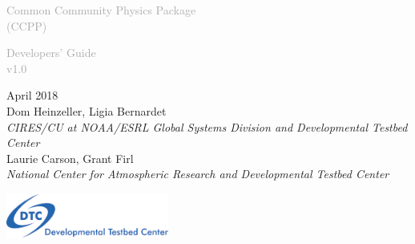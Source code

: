 \begin{titlepage}
\renewcommand{\thefootnote}{\fnsymbol{footnote}}

\vspace*{1em}
\noindent

\begin{center}
\textcolor{darkgray}{\bigsf Common Community Physics Package\\[0.5ex] (CCPP)}
\vspace*{1em}

\textcolor{darkgray}{\bigst Developers' Guide\\[0.5ex] v1.0}
\vspace*{1em}

\large{April 2018}\\[4em]

Dom Heinzeller, Ligia Bernardet\\
\textit{\small{CIRES/CU at NOAA/ESRL Global Systems Division and Developmental Testbed Center}}\\[4em]

Laurie Carson, Grant Firl\\
\textit{\small{National Center for Atmospheric Research and Developmental Testbed Center}}\\[4em]

\vspace{4em}

\includegraphics[width=0.4\textwidth]{images/dtc_logo.png}\\[2em]

\end{center}
\end{titlepage}
\pagebreak{}
